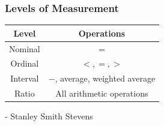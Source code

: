 \documentclass[12pt, block=fill]{beamer}
\begin{document}
\begin{frame}
  \frametitle{Levels of Measurement}

  \center
  \begin{tabular}{c | c}
  Level & Operations \\
  \hline
  Nominal & = \\
  Ordinal & $<,=,>$ \\
  Interval & $-$, average, weighted average \\
  Ratio & All arithmetic operations
  \end{tabular}
\footnotesize \flushright  - Stanley Smith Stevens

\end{frame}
\end{document}
